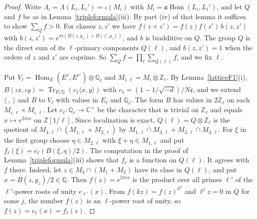 \begin{proof}
Write $\Lambda_i=\Lambda(L_i,L_i')=\iota(M_i)$ with $M_i=\mathfrak a\operatorname{Hom}(L_i,L_i')$, and let $Q$ and $f$ be as in Lemma~\ref{tripleformula}(iii). By part (iv) of that lemma it suffices to show $\sum_Qf>0$. For classes $z,z'$ we have $f(z+z')=f(z)f(z')\,b(z,z')$ with $b(z,z')=e^{\pi i(B(z,y_{z'})+B(z',y_z))}$, and $b$ is biadditive on $Q$. The group $Q$ is the direct sum of its $\ell$-primary components $Q(\ell)$, and $b(z,z')=1$ when the orders of $z$ and $z'$ are coprime. So $\sum_Qf=\prod_\ell\sum_{Q(\ell)}f$, and we fix $\ell$.

Put $V_\ell=\operatorname{Hom}_E(E^r,E^{r'})\otimes\mathbb Q_\ell$ and $M_{i,\ell}=M_i\otimes\mathbb Z_\ell$. By Lemma~\ref{latticeF1}(i), $B(\iota x,\iota y)=\operatorname{Tr}_{E/\mathbb Q}(c_1\langle x,y\rangle)$ with $c_1=(1-1/\sqrt{-d})/N\mathfrak c$, and we extend $\langle\ ,\ \rangle$ and $B$ to $V_\ell$ with values in $E_\ell$ and $\mathbb Q_\ell$. The form $B$ has values in $2\mathbb Z_\ell$ on each $M_{i,\ell}\times M_{i,\ell}$. Let $e_\ell\colon\mathbb Q_\ell\to\mathbb C^\times$ be the character that is trivial on $\mathbb Z_\ell$ and equals $x\mapsto e^{2\pi ix}$ on $\mathbb Z[1/\ell]$. Since localization is exact, $Q(\ell)=Q\otimes\mathbb Z_\ell$ is the quotient of $M_{3,\ell}\cap(M_{1,\ell}+M_{2,\ell})$ by $M_{1,\ell}\cap M_{3,\ell}+M_{2,\ell}\cap M_{3,\ell}$. For $\xi$ in the first group choose $\eta\in M_{2,\ell}$ with $\xi+\eta\in M_{1,\ell}$ and put $f_\ell(\xi)=e_\ell(B(\xi,\eta)/2)$. The computation in the proof of Lemma~\ref{tripleformula}(iii) shows that $f_\ell$ is a function on $Q(\ell)$. It agrees with $f$ there. Indeed, let $z\in M_3\cap(M_1+M_2)$ have its class in $Q(\ell)$, and put $x=B(z,y_z)/2\in\mathbb Q$. Then $f(z)=e^{2\pi ix}$ is the product over all primes $\ell'$ of the $\ell'$-power roots of unity $e_{\ell'}(x)$. From $f(kz)=f(z)^{k^2}$ and $\ell^jz=0$ in $Q$ for some $j$, the number $f(z)$ is an $\ell$-power root of unity, so $f(z)=e_\ell(x)=f_\ell(z)$.


\end{proof}
